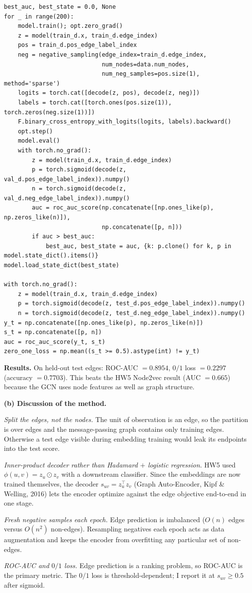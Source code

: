 \documentclass{article}
\begin{document}
\begin{tcolorbox}[colback=white, colframe=black!75, breakable, title=\textbf{Solution to Exercise 2}]
\begin{lstlisting}[style=python2]
best_auc, best_state = 0.0, None
for _ in range(200):
    model.train(); opt.zero_grad()
    z = model(train_d.x, train_d.edge_index)
    pos = train_d.pos_edge_label_index
    neg = negative_sampling(edge_index=train_d.edge_index,
                            num_nodes=data.num_nodes,
                            num_neg_samples=pos.size(1), method='sparse')
    logits = torch.cat([decode(z, pos), decode(z, neg)])
    labels = torch.cat([torch.ones(pos.size(1)), torch.zeros(neg.size(1))])
    F.binary_cross_entropy_with_logits(logits, labels).backward()
    opt.step()
    model.eval()
    with torch.no_grad():
        z = model(train_d.x, train_d.edge_index)
        p = torch.sigmoid(decode(z, val_d.pos_edge_label_index)).numpy()
        n = torch.sigmoid(decode(z, val_d.neg_edge_label_index)).numpy()
        auc = roc_auc_score(np.concatenate([np.ones_like(p), np.zeros_like(n)]),
                            np.concatenate([p, n]))
        if auc > best_auc:
            best_auc, best_state = auc, {k: p.clone() for k, p in model.state_dict().items()}
model.load_state_dict(best_state)

with torch.no_grad():
    z = model(train_d.x, train_d.edge_index)
    p = torch.sigmoid(decode(z, test_d.pos_edge_label_index)).numpy()
    n = torch.sigmoid(decode(z, test_d.neg_edge_label_index)).numpy()
y_t = np.concatenate([np.ones_like(p), np.zeros_like(n)])
s_t = np.concatenate([p, n])
auc = roc_auc_score(y_t, s_t)
zero_one_loss = np.mean((s_t >= 0.5).astype(int) != y_t)
\end{lstlisting}

\medskip
\textbf{Results.} On held-out test edges: ROC-AUC $=0.8954$, $0/1$ loss $= 0.2297$ (accuracy $= 0.7703$). This beats the HW5 Node2vec result (AUC $= 0.665$) because the GCN uses node features as well as graph structure.

\bigskip
\textbf{(b) Discussion of the method.}

\emph{Split the edges, not the nodes.} The unit of observation is an edge, so the partition is over edges and the message-passing graph contains only training edges. Otherwise a test edge visible during embedding training would leak its endpoints into the test score.

\emph{Inner-product decoder rather than Hadamard $+$ logistic regression.} HW5 used $\phi(u,v)=z_u\odot z_v$ with a downstream classifier. Since the embeddings are now trained themselves, the decoder $s_{uv}=z_u^\top z_v$ (Graph Auto-Encoder, Kipf \& Welling, 2016) lets the encoder optimize against the edge objective end-to-end in one stage.

\emph{Fresh negative samples each epoch.} Edge prediction is imbalanced ($O(n)$ edges versus $O(n^2)$ non-edges). Resampling negatives each epoch acts as data augmentation and keeps the encoder from overfitting any particular set of non-edges.

\emph{ROC-AUC and $0/1$ loss.} Edge prediction is a ranking problem, so ROC-AUC is the primary metric. The $0/1$ loss is threshold-dependent; I report it at $s_{uv}\geq 0.5$ after sigmoid.
\end{tcolorbox}
\end{document}
